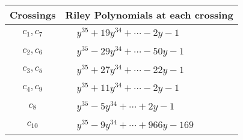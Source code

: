 \documentclass[1p]{elsarticle_modified}
\theoremstyle{definition}
\begin{document}
\begin{tabular}{m{50pt}|m{274pt}}
Crossings & \hspace{64pt}Riley Polynomials at each crossing \\
\hline $$\begin{aligned}c_{1},c_{7}\end{aligned}$$&$\begin{aligned}
&y^{35}+19 y^{34}+\cdots-2 y-1
\end{aligned}$\\
\hline $$\begin{aligned}c_{2},c_{6}\end{aligned}$$&$\begin{aligned}
&y^{35}-29 y^{34}+\cdots-50 y-1
\end{aligned}$\\
\hline $$\begin{aligned}c_{3},c_{5}\end{aligned}$$&$\begin{aligned}
&y^{35}+27 y^{34}+\cdots-22 y-1
\end{aligned}$\\
\hline $$\begin{aligned}c_{4},c_{9}\end{aligned}$$&$\begin{aligned}
&y^{35}+11 y^{34}+\cdots-2 y-1
\end{aligned}$\\
\hline $$\begin{aligned}c_{8}\end{aligned}$$&$\begin{aligned}
&y^{35}-5 y^{34}+\cdots+2 y-1
\end{aligned}$\\
\hline $$\begin{aligned}c_{10}\end{aligned}$$&$\begin{aligned}
&y^{35}-9 y^{34}+\cdots+966 y-169
\end{aligned}$\\
\hline
\end{tabular}
\vskip 2pc
\end{document}
